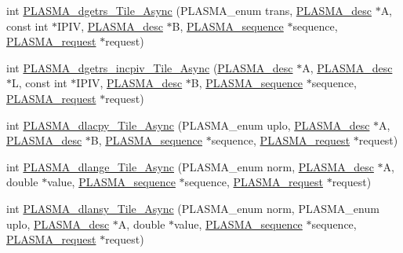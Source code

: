 \begin{DoxyCompactItemize}
\item 
int \hyperlink{group__double__Tile__Async_ga0961e66f8d5a365d6cb5168d79352d38_ga0961e66f8d5a365d6cb5168d79352d38}{P\+L\+A\+S\+M\+A\+\_\+dgetrs\+\_\+\+Tile\+\_\+\+Async} (P\+L\+A\+S\+M\+A\+\_\+enum trans, \hyperlink{structplasma__desc__t}{P\+L\+A\+S\+M\+A\+\_\+desc} $\ast$A, const int $\ast$I\+P\+I\+V, \hyperlink{structplasma__desc__t}{P\+L\+A\+S\+M\+A\+\_\+desc} $\ast$B, \hyperlink{structplasma__sequence__t}{P\+L\+A\+S\+M\+A\+\_\+sequence} $\ast$sequence, \hyperlink{structplasma__request__t}{P\+L\+A\+S\+M\+A\+\_\+request} $\ast$request)
\item 
int \hyperlink{group__double__Tile__Async_gad4fdfb4fef65809538868f6f26b82092_gad4fdfb4fef65809538868f6f26b82092}{P\+L\+A\+S\+M\+A\+\_\+dgetrs\+\_\+incpiv\+\_\+\+Tile\+\_\+\+Async} (\hyperlink{structplasma__desc__t}{P\+L\+A\+S\+M\+A\+\_\+desc} $\ast$A, \hyperlink{structplasma__desc__t}{P\+L\+A\+S\+M\+A\+\_\+desc} $\ast$L, const int $\ast$I\+P\+I\+V, \hyperlink{structplasma__desc__t}{P\+L\+A\+S\+M\+A\+\_\+desc} $\ast$B, \hyperlink{structplasma__sequence__t}{P\+L\+A\+S\+M\+A\+\_\+sequence} $\ast$sequence, \hyperlink{structplasma__request__t}{P\+L\+A\+S\+M\+A\+\_\+request} $\ast$request)
\item 
int \hyperlink{group__double__Tile__Async_ga8a0cbef7bbfe361f68088229176f005f_ga8a0cbef7bbfe361f68088229176f005f}{P\+L\+A\+S\+M\+A\+\_\+dlacpy\+\_\+\+Tile\+\_\+\+Async} (P\+L\+A\+S\+M\+A\+\_\+enum uplo, \hyperlink{structplasma__desc__t}{P\+L\+A\+S\+M\+A\+\_\+desc} $\ast$A, \hyperlink{structplasma__desc__t}{P\+L\+A\+S\+M\+A\+\_\+desc} $\ast$B, \hyperlink{structplasma__sequence__t}{P\+L\+A\+S\+M\+A\+\_\+sequence} $\ast$sequence, \hyperlink{structplasma__request__t}{P\+L\+A\+S\+M\+A\+\_\+request} $\ast$request)
\item 
int \hyperlink{group__double__Tile__Async_ga1c9b20076aec820115b5683961690187_ga1c9b20076aec820115b5683961690187}{P\+L\+A\+S\+M\+A\+\_\+dlange\+\_\+\+Tile\+\_\+\+Async} (P\+L\+A\+S\+M\+A\+\_\+enum norm, \hyperlink{structplasma__desc__t}{P\+L\+A\+S\+M\+A\+\_\+desc} $\ast$A, double $\ast$value, \hyperlink{structplasma__sequence__t}{P\+L\+A\+S\+M\+A\+\_\+sequence} $\ast$sequence, \hyperlink{structplasma__request__t}{P\+L\+A\+S\+M\+A\+\_\+request} $\ast$request)
\item 
int \hyperlink{group__double__Tile__Async_ga72766623f8ee6165ff0475725134a863_ga72766623f8ee6165ff0475725134a863}{P\+L\+A\+S\+M\+A\+\_\+dlansy\+\_\+\+Tile\+\_\+\+Async} (P\+L\+A\+S\+M\+A\+\_\+enum norm, P\+L\+A\+S\+M\+A\+\_\+enum uplo, \hyperlink{structplasma__desc__t}{P\+L\+A\+S\+M\+A\+\_\+desc} $\ast$A, double $\ast$value, \hyperlink{structplasma__sequence__t}{P\+L\+A\+S\+M\+A\+\_\+sequence} $\ast$sequence, \hyperlink{structplasma__request__t}{P\+L\+A\+S\+M\+A\+\_\+request} $\ast$request)

\end{DoxyCompactItemize}
